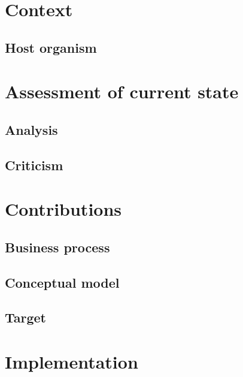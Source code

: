 \documentclass[11pt]{book}
\begin{document}
    \chapter{Context}\label{sec:context}
    

    \section{Host organism}\label{sec:host-organization}
    

    \chapter{Assessment of current state}\label{sec:assessment-of-current-state}
    \section{Analysis}\label{sec:analysis}
    

    \section{Criticism}\label{sec:criticism}
    

    \chapter{Contributions}
    \section{Business process}\label{sec:business-process}
    

    \section{Conceptual model}\label{sec:conceptual-model}
    

    \section{Target}\label{sec:target-comp}
    

    \chapter{Implementation}\label{sec:implementation}
    
\end{document}
